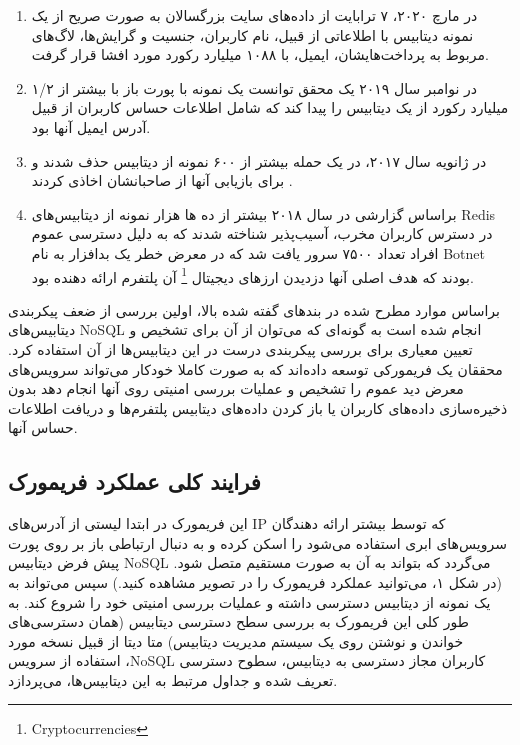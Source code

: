 \documentclass[10pt, a4paper]{article}
\begin{document}
\begin{enumerate}
    \item در مارچ ۲۰۲۰، ۷ ترابایت از داده‌های سایت بزرگسالان به صورت صریح از یک
    نمونه دیتابیس  با اطلاعاتی از قبیل، نام کاربران، جنسیت و
    گرایش‌ها، لاگ‌های مربوط به پرداخت‌هایشان، ایمیل، با ۱۰۸۸ میلیارد رکورد مورد
    افشا قرار گرفت.
    \item در نوامبر سال ۲۰۱۹ یک محقق توانست یک نمونه با پورت باز با بیشتر از ۱/۲
    میلیارد رکورد از یک دیتابیس را پیدا کند که شامل اطلاعات حساس کاربران از قبیل
    آدرس ایمیل آنها بود.
    \item در ژانویه سال ۲۰۱۷، در یک حمله بیشتر از ۶۰۰ نمونه از دیتابیس
     حذف شدند و برای بازیابی آنها از صاحبانشان اخاذی کردند
    \cite{mongoransacked}.
    \item براساس گزارشی در سال ۲۰۱۸ بیشتر از ده ها هزار نمونه از دیتابیس‌های
    Redis در دسترس کاربران مخرب، آسیب‌پذیر شناخته شدند که به دلیل دسترسی عموم
    افراد تعداد ۷۵۰۰ سرور یافت شد که در معرض خطر یک بدافزار به نام Botnet بودند
    که هدف اصلی آنها دزدیدن ارز‌های دیجیتال \footnote{Cryptocurrencies} آن
    پلتفرم ارائه دهنده بود.
\end{enumerate}

براساس موارد مطرح شده در بند‌های گفته شده بالا، اولین بررسی از ضعف پیکربندی
دیتابیس‌های NoSQL انجام شده است به گونه‌ای که می‌توان از آن برای تشخیص و تعیین
معیاری برای بررسی پیکربندی درست در این دیتابیس‌ها از آن استفاده کرد. محققان یک
فریمورکی توسعه داده‌اند که به صورت کاملا خودکار می‌تواند سرویس‌های معرض دید عموم
را تشخیص و عملیات بررسی امنیتی روی آنها انجام دهد بدون ذخیره‌سازی داده‌های
کاربران یا باز کردن داده‌های دیتابیس پلتفرم‌ها و دریافت اطلاعات حساس آنها.

\subsection{فرایند کلی عملکرد فریمورک \cite{ferrari2020nosql}} 

این فریمورک در ابتدا لیستی از آدرس‌های IP که توسط بیشتر ارائه دهندگان سرویس‌های
ابری استفاده می‌شود را اسکن کرده و به دنبال ارتباطی باز بر روی پورت پیش فرض
دیتابیس NoSQL می‌گردد که بتواند به آن به صورت مستقیم متصل شود. (در شکل ۱،
می‌توانید عملکرد فریمورک را در تصویر مشاهده کنید.) سپس می‌تواند به یک نمونه از
دیتابیس دسترسی داشته و عملیات بررسی امنیتی خود را شروع کند.  به طور کلی این
فریمورک به بررسی سطح دسترسی دیتابیس (همان دسترسی‌های خواندن و نوشتن روی یک سیستم
مدیریت دیتابیس) متا دیتا از قبیل نسخه مورد استفاده از سرویس ،NoSQL کاربران مجاز
دسترسی به دیتابیس، سطوح دسترسی تعریف شده و جداول مرتبط به این دیتابیس‌ها،
می‌پردازد. 
\end{document}
